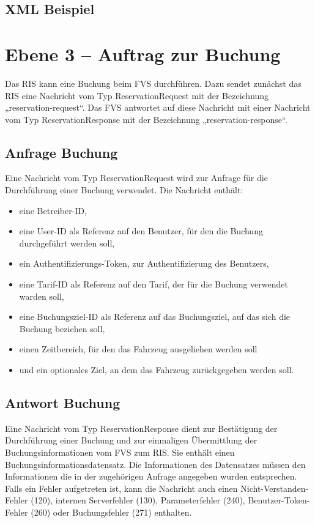 

\subsection{XML Beispiel}

\section{Ebene 3 -- Auftrag zur Buchung}
Das RIS kann eine Buchung beim FVS durchführen. Dazu sendet zunächst das RIS eine Nachricht vom Typ ReservationRequest mit der Bezeichnung „reservation-request“. Das FVS antwortet auf diese Nachricht mit einer Nachricht vom Typ ReservationResponse mit der Bezeichnung „reservation-response“.



\subsection{Anfrage Buchung}
Eine Nachricht vom Typ ReservationRequest wird zur Anfrage für die Durchführung einer Buchung verwendet. Die Nachricht enthält:
\begin{itemize}
\item eine Betreiber-ID,
\item eine User-ID als Referenz auf den Benutzer, für den die Buchung durchgeführt werden soll,
\item ein Authentifizierungs-Token, zur Authentifizierung des Benutzers,
\item eine Tarif-ID als Referenz auf den Tarif, der für die Buchung verwendet warden soll,
\item eine Buchungsziel-ID als Referenz auf das Buchungsziel, auf das sich die Buchung beziehen soll,
\item einen Zeitbereich, für den das Fahrzeug ausgeliehen werden soll
\item und ein optionales Ziel, an dem das Fahrzeug zurückgegeben werden soll.
\end{itemize}



\subsection{Antwort Buchung}
Eine Nachricht vom Typ ReservationResponse dient zur Bestätigung der Durchführung einer Buchung und zur einmaligen Übermittlung der Buchungsinformationen vom FVS zum RIS. Sie enthält einen Buchungsinformationsdatensatz. Die Informationen des Datensatzes müssen den Informationen die in der zugehörigen Anfrage angegeben wurden entsprechen. Falls ein Fehler aufgetreten ist, kann die Nachricht auch einen Nicht-Verstanden-Fehler (120), internen Serverfehler (130), Parameterfehler (240), Benutzer-Token-Fehler (260) oder Buchungsfehler (271) enthalten.

